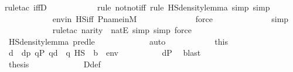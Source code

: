 \begin{isabellebody}
{\isacharparenleft}{\kern0pt}rule{\isacharunderscore}{\kern0pt}tac\ iffD{}{\isacharparenright}{\kern0pt}\isanewline
\ \ \ \ \ \ \ \ \ \ \ \isamarkupfalse%
{\isacharparenleft}{\kern0pt}rule\ notnot{\isacharunderscore}{\kern0pt}iff{\isacharcomma}{\kern0pt}\ rule\ HS{\isacharunderscore}{\kern0pt}density{\isacharunderscore}{\kern0pt}lemma{\isacharcomma}{\kern0pt}\ simp{\isacharcomma}{\kern0pt}\ simp{\isacharparenright}{\kern0pt}\isanewline
\ \ \ \ \ \ \ \ \ \ \isamarkupfalse%
\ envin\ HS{\isacharunderscore}{\kern0pt}iff\ P{\isacharunderscore}{\kern0pt}name{\isacharunderscore}{\kern0pt}in{\isacharunderscore}{\kern0pt}M\isanewline
\ \ \ \ \ \ \ \ \ \ \ \ \isamarkupfalse%
\ force\ \isanewline
\ \ \ \ \ \ \ \ \ \ \ \isamarkupfalse%
\ simp\isanewline
\ \ \ \ \ \ \ \ \ \ \ \isamarkupfalse%
{\isacharparenleft}{\kern0pt}rule{\isacharunderscore}{\kern0pt}tac\ n{\isacharequal}{\kern0pt}{\isachardoublequoteopen}arity{\isacharparenleft}{\kern0pt}{\isasymphi}{\isacharparenright}{\kern0pt}{\isachardoublequoteclose}\ \ natE{\isacharcomma}{\kern0pt}\ simp{\isacharcomma}{\kern0pt}\ simp{\isacharcomma}{\kern0pt}\ force{\isacharparenright}{\kern0pt}\isanewline
\ \ \ \ \ \ \ \ \ \ \isamarkupfalse%
\ HS{\isacharunderscore}{\kern0pt}density{\isacharunderscore}{\kern0pt}lemma\ pred{\isacharunderscore}{\kern0pt}le{}\ \isanewline
\ \ \ \ \ \ \ \ \ \ \isamarkupfalse%
\ auto\isanewline
\ \ \ \ \ \ \ \ \isamarkupfalse%
\ \isamarkupfalse%
\ this\isanewline
\ \ \ \ \ \ \ \ \isamarkupfalse%
\ d\ \ {\isachardoublequoteopen}d{\isasympreceq}p{\isachardoublequoteclose}\ {\isachardoublequoteopen}{\isasymforall}q{\isasymin}P{\isachardot}{\kern0pt}\ q{\isasympreceq}d\ {\isasymlongrightarrow}\ {\isasymnot}{\isacharparenleft}{\kern0pt}q\ {\isasymtturnstile}HS\ {\isasymphi}\ {\isacharparenleft}{\kern0pt}{\isacharbrackleft}{\kern0pt}b{\isacharbrackright}{\kern0pt}\ {\isacharat}{\kern0pt}\ env{\isacharparenright}{\kern0pt}{\isacharparenright}{\kern0pt}{\isachardoublequoteclose}\isanewline
\ \ \ \ \ \ \ \ \ \ {\isachardoublequoteopen}d{\isasymin}P{\isachardoublequoteclose}\ \isamarkupfalse%
\ blast\isanewline
\ \ \ \ \ \ \ \ \isamarkupfalse%
\isanewline
\ \ \ \ \ \ \ \ \isamarkupfalse%
\ {\isacharquery}{\kern0pt}thesis\ \isanewline
\ \ \ \ \ \ \ \ \ \ \isamarkupfalse%
\ D{\isacharunderscore}{\kern0pt}def\isanewline

\end{isabellebody}
